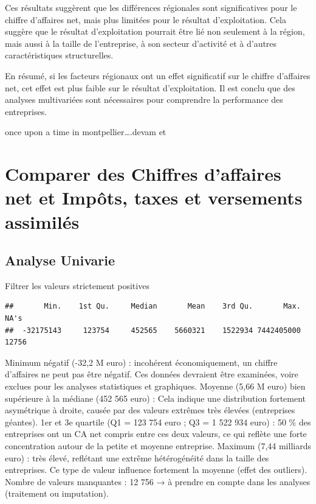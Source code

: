 \documentclass[mstat,12pt]{unswthesis}
\begin{document}
Ces résultats suggèrent que les différences régionales sont
significatives pour le chiffre d'affaires net, mais plus limitées pour
le résultat d'exploitation. Cela suggère que le résultat d'exploitation
pourrait être lié non seulement à la région, mais aussi à la taille de
l'entreprise, à son secteur d'activité et à d'autres caractéristiques
structurelles.

En résumé, si les facteurs régionaux ont un effet significatif sur le
chiffre d'affaires net, cet effet est plus faible sur le résultat
d'exploitation. Il est conclu que des analyses multivariées sont
nécessaires pour comprendre la performance des entreprises.

once upon a time in montpellier\ldots.devam et

\newpage

\section{\texorpdfstring{\textbf{Comparer des Chiffres d'affaires net et
Impôts, taxes et versements
assimilés}}{Comparer des Chiffres d'affaires net et Impôts, taxes et versements assimilés}}\label{comparer-des-chiffres-daffaires-net-et-impuxf4ts-taxes-et-versements-assimiluxe9s}

\medskip

\subsection{Analyse Univarie}\label{analyse-univarie-1}

Filtrer les valeurs strictement positives

\medskip

\scriptsize

\begin{verbatim}
##       Min.    1st Qu.     Median       Mean    3rd Qu.       Max.       NA's 
##  -32175143     123754     452565    5660321    1522934 7442405000      12756
\end{verbatim}

\normalsize

\medskip

Minimum négatif (-32,2 M euro) : incohérent économiquement, un chiffre
d'affaires ne peut pas être négatif. Ces données devraient être
examinées, voire exclues pour les analyses statistiques et graphiques.
Moyenne (5,66 M euro) bien supérieure à la médiane (452 565 euro) : Cela
indique une distribution fortement asymétrique à droite, causée par des
valeurs extrêmes très élevées (entreprises géantes). 1er et 3e quartile
(Q1 = 123 754 euro ; Q3 = 1 522 934 euro) : 50 \% des entreprises ont un
CA net compris entre ces deux valeurs, ce qui reflète une forte
concentration autour de la petite et moyenne entreprise. Maximum (7,44
milliards euro) : très élevé, reflétant une extrême hétérogénéité dans
la taille des entreprises. Ce type de valeur influence fortement la
moyenne (effet des outliers). Nombre de valeurs manquantes : 12 756 → à
prendre en compte dans les analyses (traitement ou imputation).
\end{document}
